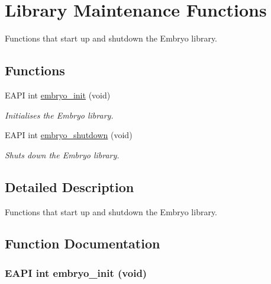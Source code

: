 \hypertarget{group__Embryo__Library__Group}{
\section{Library Maintenance Functions}
\label{group__Embryo__Library__Group}
}
Functions that start up and shutdown the Embryo library.  
\subsection*{Functions}
\begin{CompactItemize}
\item 
EAPI int \hyperlink{group__Embryo__Library__Group_ge938f7af6432daaad3278c5fe80f281c}{embryo\_\-init} (void)
\begin{CompactList}\small\item\em Initialises the Embryo library. \item\end{CompactList}\item 
EAPI int \hyperlink{group__Embryo__Library__Group_g0e9ce7c1cc694db3195fdf754cd7374a}{embryo\_\-shutdown} (void)
\begin{CompactList}\small\item\em Shuts down the Embryo library. \item\end{CompactList}\end{CompactItemize}


\subsection{Detailed Description}
Functions that start up and shutdown the Embryo library. 



\subsection{Function Documentation}
\hypertarget{group__Embryo__Library__Group_ge938f7af6432daaad3278c5fe80f281c}{
\subsubsection{\setlength{\rightskip}{0pt plus 5cm}EAPI int embryo\_\-init (void)}}
\label{group__Embryo__Library__Group_ge938f7af6432daaad3278c5fe80f281c}



